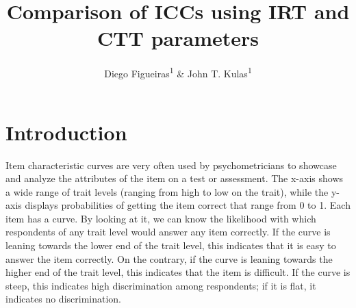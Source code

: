 \documentclass[
  english,
  man,floatsintext]{apa6}
\title{Comparison of ICCs using IRT and CTT parameters}
\author{Diego Figueiras\textsuperscript{1} \& John T. Kulas\textsuperscript{1}}
\date{}
\affiliation{\vspace{0.5cm}\textsuperscript{1} Montclair State University}
\begin{document}
\maketitle

\hypertarget{introduction}{%
\section{Introduction}\label{introduction}}

Item characteristic curves are very often used by psychometricians to showcase and analyze the attributes of the item on a test or assessment. The x-axis shows a wide range of trait levels (ranging from high to low on the trait), while the y-axis displays probabilities of getting the item correct that range from 0 to 1. Each item has a curve. By looking at it, we can know the likelihood with which respondents of any trait level would answer any item correctly. If the curve is leaning towards the lower end of the trait level, this indicates that it is easy to answer the item correctly. On the contrary, if the curve is leaning towards the higher end of the trait level, this indicates that the item is difficult. If the curve is steep, this indicates high discrimination among respondents; if it is flat, it indicates no discrimination.
\end{document}
